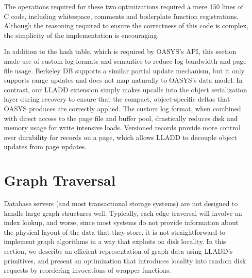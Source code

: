 \documentclass[10pt,letterpaper,twocolumn,english]{article}
\newcommand{\yad}{LLADD\xspace}
\newcommand{\oasys}{OASYS\xspace}
\begin{document}
The operations required for these
two optimizations required a mere 150 lines of C code, including
whitespace, comments and boilerplate function registrations.  Although
the reasoning required to ensure the correctness of this code is
complex, the simplicity of the implementation is encouraging.

In addition to the hash table, which is required by \oasys's API, this
section made use of custom log formats and semantics to reduce log
bandwidth and page file usage.  Berkeley DB supports a similar
partial update mechanism, but it only
supports range updates and does not map naturally to \oasys's data
model.  In contrast, our \yad extension simply makes upcalls
into the object serialization layer during recovery to ensure that the
compact, object-specific deltas that \oasys produces are correctly
applied.  The custom log format, when combined with direct access to
the page file and buffer pool, drastically reduces disk and memory usage
for write intensive loads.
Versioned records provide more control over durability for
records on a page, which allows \yad to decouple object updates from page
updates.

%

\section{Graph Traversal\label{TransClos}}

Database servers (and most transactional storage systems) are not
designed to handle large graph structures well.  Typically, each edge
traversal will involve an index lookup, and worse, since most systems
do not provide information about the physical layout of the data that
they store, it is not straightforward to implement graph algorithms in
a way that exploits on disk locality.  In this section, we describe an
efficient representation of graph data using \yad's primitives, and
present an optimization that introduces locality into random disk
requests by reordering invocations of wrapper functions.
\end{document}
